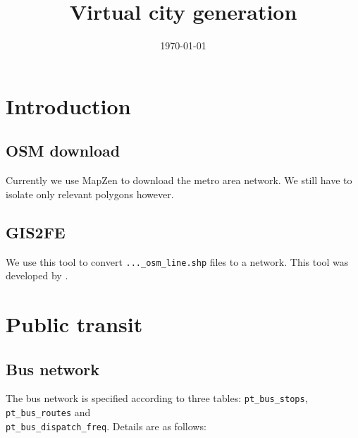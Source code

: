 \documentclass[11pt,twoside]{article}
\numberwithin{equation}{section}
\newcommand{\?}{\stackrel{?}{=}}
\begin{document}
\title{Virtual city generation}
\date{\small\today}
\maketitle

\thispagestyle{empty}

\tableofcontents
\section{Introduction} 

\subsection{OSM download}
Currently we use MapZen to download the metro area network.
We still have to isolate only relevant polygons however.

\subsection{GIS2FE}
We use this tool to convert \texttt{...\_osm\_line.shp} files to a network.
This tool was developed by \cite{karduni2016protocol,}.


\section{Public transit}

\subsection{Bus network}
The bus network is specified according to three tables:
\texttt{pt\_bus\_stops}, \texttt{pt\_bus\_routes} and\\ \texttt{pt\_bus\_dispatch\_freq}.
Details are as follows:
\end{document}
